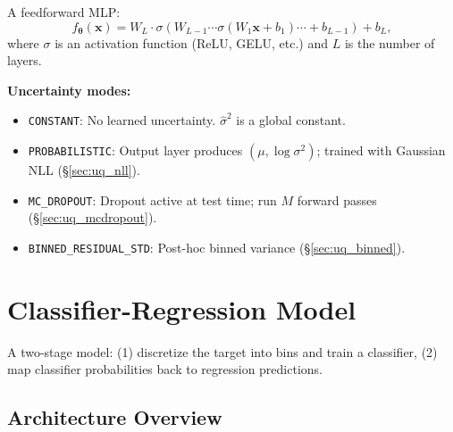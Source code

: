 \documentclass[11pt,a4paper]{article}
\theoremstyle{definition}
\newcommand{\bx}{\mathbf{x}}
\newcommand{\btheta}{\boldsymbol{\theta}}
\begin{document}
A feedforward MLP:
\[
  f_\btheta(\bx) = W_L \cdot \sigma(W_{L-1} \cdots \sigma(W_1 \bx + b_1) \cdots + b_{L-1}) + b_L,
\]
where $\sigma$ is an activation function (ReLU, GELU, etc.) and $L$ is the
number of layers.

\textbf{Uncertainty modes:}
\begin{itemize}[nosep]
  \item \texttt{CONSTANT}: No learned uncertainty. $\hat{\sigma}^2$ is a global constant.
  \item \texttt{PROBABILISTIC}: Output layer produces $(\mu, \log\sigma^2)$; trained with Gaussian NLL (\S\ref{sec:uq_nll}).
  \item \texttt{MC\_DROPOUT}: Dropout active at test time; run $M$ forward passes (\S\ref{sec:uq_mcdropout}).
  \item \texttt{BINNED\_RESIDUAL\_STD}: Post-hoc binned variance (\S\ref{sec:uq_binned}).
\end{itemize}

\section{Classifier-Regression Model}
\label{sec:classreg}

A two-stage model: (1) discretize the target into bins and train a
classifier, (2) map classifier probabilities back to regression predictions.

\subsection{Architecture Overview}
\end{document}
